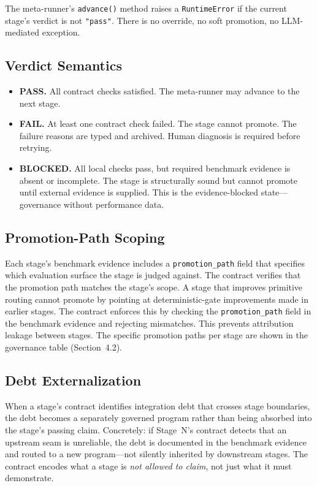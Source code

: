 \documentclass[11pt]{article}
\begin{document}
The meta-runner's \texttt{advance()} method raises a \texttt{RuntimeError} if the current stage's verdict is not \texttt{"pass"}. There is no override, no soft promotion, no LLM-mediated exception.

\subsection{Verdict Semantics}

\begin{itemize}[nosep]
\item \textbf{PASS.} All contract checks satisfied. The meta-runner may advance to the next stage.
\item \textbf{FAIL.} At least one contract check failed. The stage cannot promote. The failure reasons are typed and archived. Human diagnosis is required before retrying.
\item \textbf{BLOCKED.} All local checks pass, but required benchmark evidence is absent or incomplete. The stage is structurally sound but cannot promote until external evidence is supplied. This is the evidence-blocked state---governance without performance data.
\end{itemize}

\subsection{Promotion-Path Scoping}

Each stage's benchmark evidence includes a \texttt{promotion\_path} field that specifies which evaluation surface the stage is judged against. The contract verifies that the promotion path matches the stage's scope. A stage that improves primitive routing cannot promote by pointing at deterministic-gate improvements made in earlier stages. The contract enforces this by checking the \texttt{promotion\_path} field in the benchmark evidence and rejecting mismatches. This prevents attribution leakage between stages. The specific promotion paths per stage are shown in the governance table (Section~4.2).

\subsection{Debt Externalization}

When a stage's contract identifies integration debt that crosses stage boundaries, the debt becomes a separately governed program rather than being absorbed into the stage's passing claim. Concretely: if Stage~N's contract detects that an upstream seam is unreliable, the debt is documented in the benchmark evidence and routed to a new program---not silently inherited by downstream stages. The contract encodes what a stage is \emph{not allowed to claim}, not just what it must demonstrate.
\end{document}
